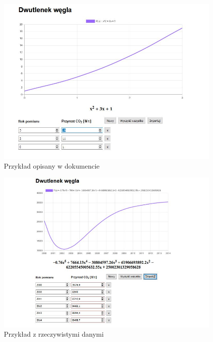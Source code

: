 \documentclass[12pt]{article}
\begin{document}
\begin{figure}
\centering
\includegraphics[scale=0.65]{correctEasyData.jpg}
\caption{Przykład opisany w dokumencie}
\end{figure}

\begin{figure}
\centering
\includegraphics[scale=0.65]{correctRealData.jpg}
\caption{Przykład z rzeczywistymi danymi}
\end{figure}

\end{document}
